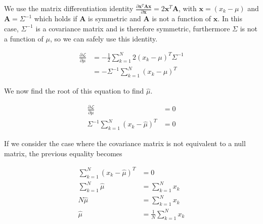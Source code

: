 \documentclass[a4paper, 10pt, twoside]{article}
\begin{document}
We use the matrix differentiation identity $\frac{\partial \mathbf{x}^T\mathbf{Ax}}{\partial \mathbf{x}} = 2\mathbf{x}^T\mathbf{A}$, with $\mathbf{x} = (x_k-\mu)$ and $\mathbf{A} = \Sigma^{-1}$ which holds if $\mathbf{A}$ is symmetric and $\mathbf{A}$ is not a function of $\mathbf{x}$. In this case, $\Sigma^{-1}$ is a covariance matrix and is therefore symmetric, furthermore $\Sigma$ is not a function of $\mu$, so we can safely use this identity.

\begin{align*}
    \frac{\partial \mathcal{L}}{\partial \mu}
     & =
    -\frac{1}{2} \sum_{k=1}^N 2 (x_k-\mu)^T \Sigma^{-1} \\
     & =
    - \Sigma^{-1} \sum_{k=1}^N (x_k-\mu)^T
\end{align*}

We now find the root of this equation to find $\hat{\mu}$.

\begin{align*}
    \frac{\partial \mathcal{L}}{\partial \mu}  & = 0 \\
    \Sigma^{-1} \sum_{k=1}^N (x_k-\hat{\mu})^T & = 0
\end{align*}

If we consider the case where the covariance matrix is not equivalent to a null matrix, the previous equality becomes

\begin{align*}
    \sum_{k=1}^N (x_k-\hat{\mu})^T & = 0                            \\
    \sum_{k=1}^N\hat{\mu}          & = \sum_{k=1}^N x_k             \\
    N\hat{\mu}                     & = \sum_{k=1}^N x_k             \\
    \hat{\mu}                      & = \frac{1}{N} \sum_{k=1}^N x_k \\
\end{align*}
\end{document}
